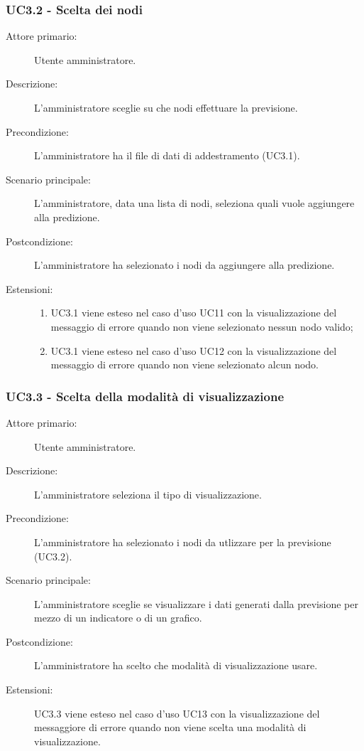 \subsubsection{UC3.2 - Scelta dei nodi}
\label{sssec:uc3.2}
\begin{description}
  \item[Attore primario:] Utente amministratore.
  \item[Descrizione:] L'amministratore sceglie su che nodi effettuare la previsione.
  \item[Precondizione:] L'amministratore ha il file di dati di addestramento (UC3.1).
  \item[Scenario principale:] L'amministratore, data una lista di nodi, seleziona quali vuole aggiungere alla predizione.
  \item[Postcondizione:] L'amministratore ha selezionato i nodi da aggiungere alla predizione.
  \item[Estensioni:]
  \begin{enumerate}	
	\item UC3.1 viene esteso nel caso d'uso UC11 con la visualizzazione del messaggio di errore quando non viene selezionato nessun nodo valido;
	\item UC3.1 viene esteso nel caso d'uso UC12 con la visualizzazione del messaggio di errore quando non viene selezionato alcun nodo.
  \end{enumerate}
\end{description}

\subsubsection{UC3.3 - Scelta della modalità di visualizzazione}
\label{sssec:uc3.3}
\begin{description}
  \item[Attore primario:] Utente amministratore.
  \item[Descrizione:] L'amministratore seleziona il tipo di visualizzazione.
  \item[Precondizione:]  L'amministratore ha selezionato i nodi da utlizzare per la previsione (UC3.2).
  \item[Scenario principale:] L'amministratore sceglie se visualizzare i dati generati dalla previsione per mezzo di un indicatore o di un grafico.
  \item[Postcondizione:] L'amministratore ha scelto che modalità di visualizzazione usare.
  \item[Estensioni:] UC3.3 viene esteso nel caso d'uso UC13 con la visualizzazione del messaggiore di errore quando non viene scelta una modalità di visualizzazione.
\end{description}

